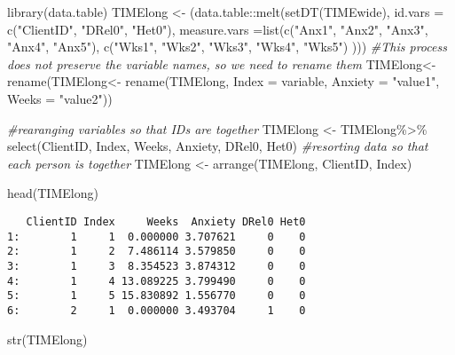 \documentclass[
  11pt,
]{book}
\newenvironment{Shaded}{\begin{snugshade}}{\end{snugshade}}
\newcommand{\AttributeTok}[1]{\textcolor[rgb]{0.77,0.63,0.00}{#1}}
\newcommand{\CommentTok}[1]{\textcolor[rgb]{0.56,0.35,0.01}{\textit{#1}}}
\newcommand{\FunctionTok}[1]{\textcolor[rgb]{0.00,0.00,0.00}{#1}}
\newcommand{\NormalTok}[1]{#1}
\newcommand{\OtherTok}[1]{\textcolor[rgb]{0.56,0.35,0.01}{#1}}
\newcommand{\SpecialCharTok}[1]{\textcolor[rgb]{0.00,0.00,0.00}{#1}}
\newcommand{\StringTok}[1]{\textcolor[rgb]{0.31,0.60,0.02}{#1}}
\begin{document}
\begin{Shaded}
\begin{Highlighting}[]
\FunctionTok{library}\NormalTok{(data.table)}
\NormalTok{TIMElong }\OtherTok{\textless{}{-}}\NormalTok{ (data.table}\SpecialCharTok{::}\FunctionTok{melt}\NormalTok{(}\FunctionTok{setDT}\NormalTok{(TIMEwide), }\AttributeTok{id.vars =} \FunctionTok{c}\NormalTok{(}\StringTok{"ClientID"}\NormalTok{, }\StringTok{"DRel0"}\NormalTok{, }\StringTok{"Het0"}\NormalTok{), }\AttributeTok{measure.vars =}\FunctionTok{list}\NormalTok{(}\FunctionTok{c}\NormalTok{(}\StringTok{"Anx1"}\NormalTok{, }\StringTok{"Anx2"}\NormalTok{, }\StringTok{"Anx3"}\NormalTok{, }\StringTok{"Anx4"}\NormalTok{, }\StringTok{"Anx5"}\NormalTok{),  }\FunctionTok{c}\NormalTok{(}\StringTok{"Wks1"}\NormalTok{, }\StringTok{"Wks2"}\NormalTok{, }\StringTok{"Wks3"}\NormalTok{, }\StringTok{"Wks4"}\NormalTok{, }\StringTok{"Wks5"}\NormalTok{) )))}
\CommentTok{\#This process  does not preserve the variable names, so we need to rename them}
\NormalTok{TIMElong}\OtherTok{\textless{}{-}} \FunctionTok{rename}\NormalTok{(TIMElong}\OtherTok{\textless{}{-}}  \FunctionTok{rename}\NormalTok{(TIMElong, }\AttributeTok{Index =}\NormalTok{ variable, }\AttributeTok{Anxiety =} \StringTok{"value1"}\NormalTok{, }\AttributeTok{Weeks =} \StringTok{"value2"}\NormalTok{))}

\CommentTok{\#rearanging variables so that IDs are together}
\NormalTok{TIMElong }\OtherTok{\textless{}{-}}\NormalTok{ TIMElong}\SpecialCharTok{\%\textgreater{}\%}
  \FunctionTok{select}\NormalTok{(ClientID, Index, Weeks, Anxiety, DRel0, Het0)}
\CommentTok{\#resorting data so that each person is together}
\NormalTok{TIMElong }\OtherTok{\textless{}{-}} \FunctionTok{arrange}\NormalTok{(TIMElong, ClientID, Index)}

\FunctionTok{head}\NormalTok{(TIMElong)}
\end{Highlighting}
\end{Shaded}

\begin{verbatim}
   ClientID Index     Weeks  Anxiety DRel0 Het0
1:        1     1  0.000000 3.707621     0    0
2:        1     2  7.486114 3.579850     0    0
3:        1     3  8.354523 3.874312     0    0
4:        1     4 13.089225 3.799490     0    0
5:        1     5 15.830892 1.556770     0    0
6:        2     1  0.000000 3.493704     1    0
\end{verbatim}

\begin{Shaded}
\begin{Highlighting}[]
\FunctionTok{str}\NormalTok{(TIMElong)}
\end{Highlighting}
\end{Shaded}
\end{document}

